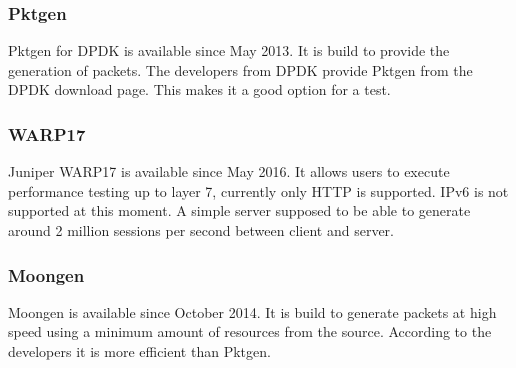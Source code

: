 \subsubsection{Pktgen}\label{subsub:dpdk-pktgen}
Pktgen for DPDK is available since May 2013. It is build to provide the generation of packets. The developers from DPDK provide Pktgen from the DPDK download page. This makes it a good option for a test. 

\subsubsection{WARP17}\label{subsub:dpdk-WARP17}
Juniper WARP17 is available since May 2016. It allows users to execute performance testing up to layer 7, currently only HTTP is supported. IPv6 is not supported at this moment. A simple server supposed to be able to generate around 2 million sessions per second between client and server.  

\subsubsection{Moongen}\label{}
Moongen is available since October 2014. It is build to generate packets at high speed using a minimum amount of resources from the source. According to the developers it is more efficient than Pktgen.
